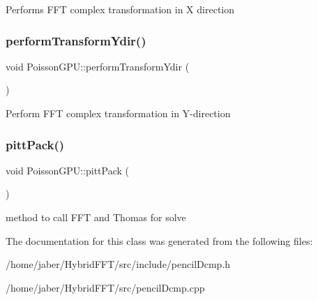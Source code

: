 Performs F\+FT complex transformation in X direction \mbox{\label{classPoissonGPU_a4ce36fbe9dd30759e3e2dab6c27d7913}} 
\subsubsection{\texorpdfstring{perform\+Transform\+Ydir()}{performTransformYdir()}}
{\footnotesize\ttfamily void Poisson\+G\+P\+U\+::perform\+Transform\+Ydir (\begin{DoxyParamCaption}{ }\end{DoxyParamCaption})}

Perform F\+FT complex transformation in Y-\/direction \mbox{\label{classPoissonGPU_a8d96442f1906d0952014d4be8cdcad30}} 
\subsubsection{\texorpdfstring{pitt\+Pack()}{pittPack()}}
{\footnotesize\ttfamily void Poisson\+G\+P\+U\+::pitt\+Pack (\begin{DoxyParamCaption}{ }\end{DoxyParamCaption})}

method to call F\+FT and Thomas for solve 

The documentation for this class was generated from the following files\+:\begin{DoxyCompactItemize}
\item 
/home/jaber/\+Hybrid\+F\+F\+T/src/include/pencil\+Dcmp.\+h\item 
/home/jaber/\+Hybrid\+F\+F\+T/src/pencil\+Dcmp.\+cpp\end{DoxyCompactItemize}
